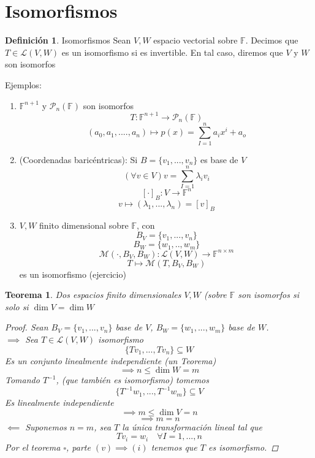 \documentclass[11pt]{book}
\newtheorem{thm}{Teorema}[section]
\theoremstyle{definition}
\newtheorem{defn}{Definición}[section]
\begin{document}
\section{Isomorfismos}
\begin{defn}{Isomorfismos}
	Sean $V,W$ espacio vectorial sobre $\mathbb{F}$. Decimos que $T\in\mathcal{L}(V,W)$ es un isomorfismo si es invertible. En tal caso, diremos que $V$ y $W$ son isomorfos
\end{defn}
Ejemplos:
\begin{enumerate}
	\item $\mathbb{F}^{n+1}$ y $\mathcal{P}_n(\mathbb{F})$ son isomorfos
	      \[T:\mathbb{F}^{n+1}\rightarrow \mathcal{P}_n(\mathbb{F})\]
	      \[(a_0,a_1,....,a_n)\mapsto p(x)=\sum^n_{I=1}a_ix^i+a_o\]

	\item (Coordenadas baricéntricas): Si $B=\{v_1,...,v_n\}$ es base de $V$
	      \[(\forall v\in V)v=\sum^n_{I=1}\lambda_i v_i\]
	      \[ [\cdot ]_B:V\rightarrow \mathbb{F}^n\]
	      \[ v\mapsto(\lambda_1,...,\lambda_n)=[v]_B\]

	\item $V,W$ finito dimensional sobre $\mathbb{F}$, con
	      \[B_V=\{v_1,...,v_n\}\]
	      \[B_W=\{w_1,..,w_m\}\]
	      \[\mathcal{M}(\cdot,B_V,B_W):\mathcal{L}(V,W)\rightarrow \mathbb{F}^{n\times m}\]
	      \[T\mapsto\mathcal{M}(T,B_V,B_W)\]
	      es un isomorfismo (ejercicio)
\end{enumerate}
\begin{thm}
	Dos espacios finito dimensionales $V,W$ (sobre $\mathbb{F}$ son isomorfos si solo si $\dim V= \dim W$
	\begin{proof}
		Sean $B_V=\{v_1,...,v_n\}$ base de $V$, $B_W=\{w_1,...,w_m\}$ base de $W$.\\
		$\implies$ Sea $T\in\mathcal{L}(V,W)$ isomorfismo
		\[\{Tv_1,...,Tv_n\}\subseteq W\]
		Es un conjunto linealmente independiente (un Teorema)
		\[\implies n\leq \dim W=m\]
		Tomando $T^{-1}$, (que también es isomorfismo) tomemos
		\[\{T^{-1}w_1,...,T^{-1}w_m\}\subseteq V\]
		Es linealmente independiente
		\[\implies m\leq\dim V=n\]
		\[\implies m=n\]
		$\impliedby$ Suponemos $n=m$, sea $T$ la única transformación lineal tal que
		\[Tv_i=w_i\quad\forall I=1,...,n\]
		Por el teorema $\square$, parte $(v)\implies (i)$ tenemos que $T$ es isomorfismo.
	\end{proof}
\end{thm}
\end{document}
